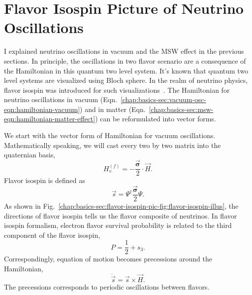 \section{\label{chap:basics-sec:flavor-isospin-pic}Flavor Isospin Picture of Neutrino Oscillations}

I explained neutrino oscillations in vacuum and the MSW effect in the previous sections. In principle, the oscillations in two flavor scenario are a consequence of the Hamiltonian in this quantum two level system. It's known that quantum two level systems are visualized using Bloch sphere. In the realm of neutrino physics, flavor isospin was introduced for such visualizations~\cite{Duan2006b}. The Hamiltonian for neutrino oscillations in vacuum (Eqn.~\ref{chap:basics-sec:vacuum-osc-eqn:hamiltonian-vacuum}) and in matter (Eqn.~\ref{chap:basics-sec:msw-eqn:hamiltonian-matter-effect}) can be reformulated into vector forms. 

We start with the vector form of Hamiltonian for vacuum oscillations. Mathematically speaking, we will cast every two by two matrix into the quaternian basis,
\begin{equation}
    H_v^{(f)} = - \frac{\vec{\boldsymbol{\sigma}} }{2}\cdot \vec H.
\end{equation}
Flavor isospin is defined as
\begin{equation}
    \vec s = \Psi^{\dagger} \frac{\vec{\boldsymbol{\sigma}} }{2} \Psi.
\end{equation}
As shown in Fig.~\ref{chap:basics-sec:flavor-isospin-pic-fig:flavor-isospin-illus}, the directions of flavor isospin tells us the flavor composite of neutrinos. In flavor isospin formalism, electron flavor survival probability is related to the third component of the flavor isospin,
\vspace*{0pt}
\begin{equation*}
P = \frac{1}{2} + s_3.
\end{equation*}
Correspondingly, equation of motion becomes precessions around the Hamiltonian,
\begin{equation}
\dot{\vec s} = \vec s \times \vec H.
\label{chap:basics-sec:flavor-isospin-pic-eqn:eom-precession}
\end{equation}
The precessions corresponds to periodic oscillations between flavors.

